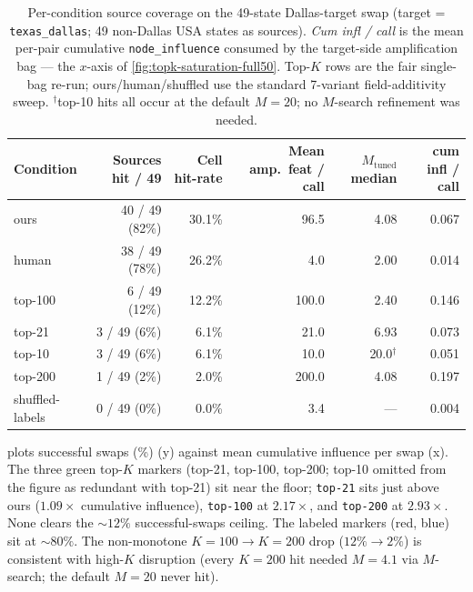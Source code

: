\begin{table}[h]
\centering\small
\begin{tabular}{lrrrr r}
\toprule
Condition & Sources hit / 49 & Cell hit-rate & Mean amp.\ feat / call & $M_{\mathrm{tuned}}$ median & cum infl / call \\
\midrule
ours      & 40 / 49 (82\%)   & 30.1\%        & 96.5                   & 4.08 & 0.067 \\
human     & 38 / 49 (78\%)   & 26.2\%        & 4.0                    & 2.00 & 0.014 \\
top-100   &  6 / 49 (12\%)   & 12.2\%        & 100.0                  & 2.40 & 0.146 \\
top-21    &  3 / 49 (6\%)    & 6.1\%         & 21.0                   & 6.93 & 0.073 \\
top-10    &  3 / 49 (6\%)    & 6.1\%         & 10.0                   & 20.0$^{\dagger}$ & 0.051 \\
top-200   &  1 / 49 (2\%)    & 2.0\%         & 200.0                  & 4.08 & 0.197 \\
shuffled-labels & 0 / 49 (0\%) & 0.0\%       & 3.4                    & ---  & 0.004 \\
\bottomrule
\end{tabular}
\caption{Per-condition source coverage on the 49-state Dallas-target swap (target = \texttt{texas\_dallas}; 49 non-Dallas USA states as sources). \emph{Cum infl / call} is the mean per-pair cumulative \texttt{node\_influence} consumed by the target-side amplification bag --- the $x$-axis of \cref{fig:topk-saturation-full50}. Top-$K$ rows are the fair single-bag re-run; ours/human/shuffled use the standard 7-variant field-additivity sweep. $^{\dagger}$top-10 hits all occur at the default $M{=}20$; no $M$-search refinement was needed.}
\label{tab:dallas-case-headline}
\end{table}

 plots successful swaps (\%) (y) against mean cumulative influence per swap (x). The three green top-$K$ markers (top-21, top-100, top-200; top-10 omitted from the figure as redundant with top-21) sit near the floor; \texttt{top-21} sits just above ours ($1.09\times$ cumulative influence), \texttt{top-100} at $2.17\times$, and \texttt{top-200} at $2.93\times$. None clears the $\sim 12\%$ successful-swaps ceiling. The labeled markers (red, blue) sit at $\sim 80\%$. The non-monotone $K{=}100 \to K{=}200$ drop ($12\% \to 2\%$) is consistent with high-$K$ disruption (every $K{=}200$ hit needed $M{=}4.1$ via $M$-search; the default $M{=}20$ never hit).


